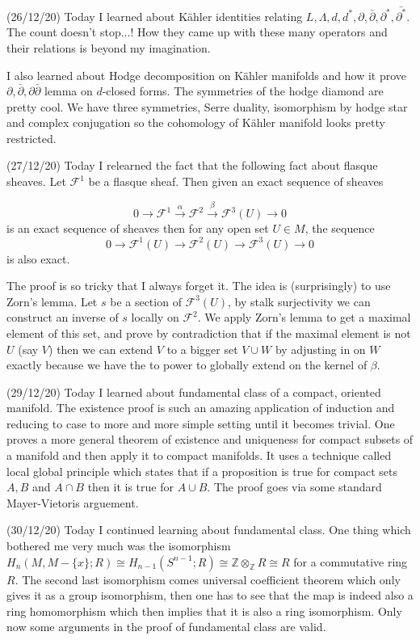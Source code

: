 \documentclass[12pt,a4paper]{article}
\begin{document}
(26/12/20) Today I learned about K\"{a}hler identities relating $L, \Lambda, d,d^*, \partial, \bar{\partial}, \partial^*, \bar{\partial^*}$. The count doesn't stop...! How they came up with these many operators and their relations is beyond my imagination. 

I also learned about Hodge decomposition on K\"{a}hler manifolds and how it prove $\partial,\bar{\partial},\partial\bar{\partial} $ lemma on $d$-closed forms. The symmetries of the hodge diamond are pretty cool. We have three symmetries, Serre duality, isomorphism by hodge star and complex conjugation so the cohomology of K\"{a}hler manifold looks pretty restricted.

(27/12/20) Today I relearned the fact that the following fact about flasque sheaves. Let $\mathcal{F}^1$ be a flasque sheaf. Then given an exact sequence of sheaves 

\[ 0 \rightarrow \mathcal{F}^1 \xrightarrow{\alpha} \mathcal{F}^2 \xrightarrow{\beta} \mathcal{F}^3(U) \rightarrow 0 \]
 is an exact sequence of sheaves then for any open set $U \in M$, the sequence 
 \[  0 \longrightarrow \mathcal{F}^1(U) \longrightarrow \mathcal{F}^2(U) \longrightarrow \mathcal{F}^3(U) \longrightarrow 0 \]
 is also exact.
 
 The proof is so tricky that I always forget it. The idea is (surprisingly) to use Zorn's lemma. Let $s$ be a section of $\mathcal{F}^3(U)$, by stalk surjectivity we can construct an inverse of $s$ locally on $\mathcal{F}^2$. We apply Zorn's lemma to get a maximal element of this set, and prove by contradiction that if the maximal element is not $U$ (say $V$) then we can extend $V$ to a bigger set $V \cup W$ by adjusting in on $W$ exactly because we have the to power to globally extend on the kernel of $\beta$.
 
 (29/12/20) Today I learned about fundamental class of a compact, oriented manifold. The existence proof is such an amazing application of induction and reducing to case to more and more simple setting until it becomes trivial. One proves a more general theorem of existence and uniqueness for compact subsets of a manifold and then apply it to compact manifolds. It uses a technique called local global principle which states that if a proposition is true for compact sets $A,B$ and $A\cap B$ then it is true for $A\cup B$. The proof goes via some standard Mayer-Vietoris arguement.
 
 (30/12/20) Today I continued learning about fundamental class. One thing which bothered me very much was the isomorphism $H_n(M,M-\{x\};R)\cong H_{n-1}(S^{n-1};R) \cong \mathbb{Z} \otimes_{\mathbb{Z}}R \cong R$ for a commutative ring $R$. 
 The second last isomorphism comes universal coefficient theorem which only gives it as a group isomorphism, then one has to see that the map is indeed also a ring homomorphism which then implies that it is also a ring isomorphism. Only now some arguments in the proof of fundamental class are valid.
 
\end{document}
